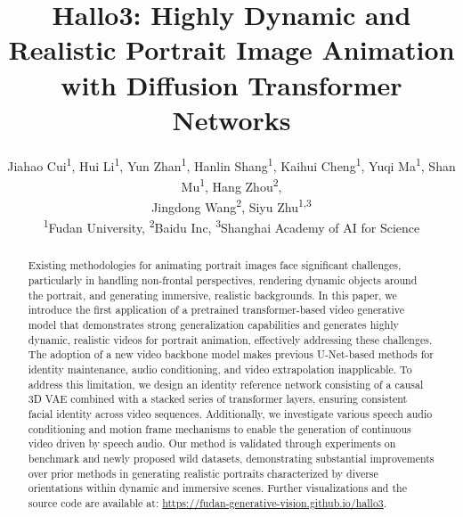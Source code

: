 \documentclass[10pt,twocolumn,letterpaper]{article}
\begin{document}
\title{Hallo3: Highly Dynamic and Realistic Portrait Image Animation with Diffusion Transformer Networks}

\author{Jiahao Cui\textsuperscript{1},
        Hui Li\textsuperscript{1},
        Yun Zhan\textsuperscript{1},
        Hanlin Shang\textsuperscript{1},
        Kaihui Cheng\textsuperscript{1},
        Yuqi Ma\textsuperscript{1},
        Shan Mu\textsuperscript{1},
        Hang Zhou\textsuperscript{2},\\
        Jingdong Wang\textsuperscript{2},\;\;\;
        Siyu Zhu\textsuperscript{1,3} \\
\textsuperscript{1}Fudan University, \;\;\textsuperscript{2}Baidu Inc,
\;\;\textsuperscript{3}Shanghai Academy of AI for Science
 \\
}
\maketitle

\begin{abstract}
Existing methodologies for animating portrait images face significant challenges, particularly in handling non-frontal perspectives, rendering dynamic objects around the portrait, and generating immersive, realistic backgrounds.
In this paper, we introduce the first application of a pretrained transformer-based video generative model that demonstrates strong generalization capabilities and generates highly dynamic, realistic videos for portrait animation, effectively addressing these challenges.
The adoption of a new video backbone model makes previous U-Net-based methods for identity maintenance, audio conditioning, and video extrapolation inapplicable. To address this limitation, we design an identity reference network consisting of a causal 3D VAE combined with a stacked series of transformer layers, ensuring consistent facial identity across video sequences.
Additionally, we investigate various speech audio conditioning and motion frame mechanisms to enable the generation of continuous video driven by speech audio. Our method is validated through experiments on benchmark and newly proposed wild datasets, demonstrating substantial improvements over prior methods in generating realistic portraits characterized by diverse orientations within dynamic and immersive scenes. Further visualizations and the source code are available at: \href{https://fudan-generative-vision.github.io/hallo3/#/}{https://fudan-generative-vision.github.io/hallo3}.

\end{abstract}



%




{\small


}
% 
\end{document}
